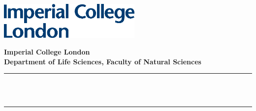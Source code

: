 \begin{titlepage}

    \newcommand{\HRule}{\rule{\linewidth}{0.5mm}} %


    \includegraphics[width=7cm]{img/logo.eps}\\[1cm]


    \center %



    \textbf{\large Imperial College London}\\[0.8 cm] %
    \textbf{\large Department of Life Sciences, Faculty of Natural Sciences}\\[0.8 cm] %
    \makeatletter
    \vspace*{1cm}
    \HRule \\[0.6cm]
    { \huge \textbf \@title}\\ %
    \HRule \\[2cm]



\end{titlepage}
